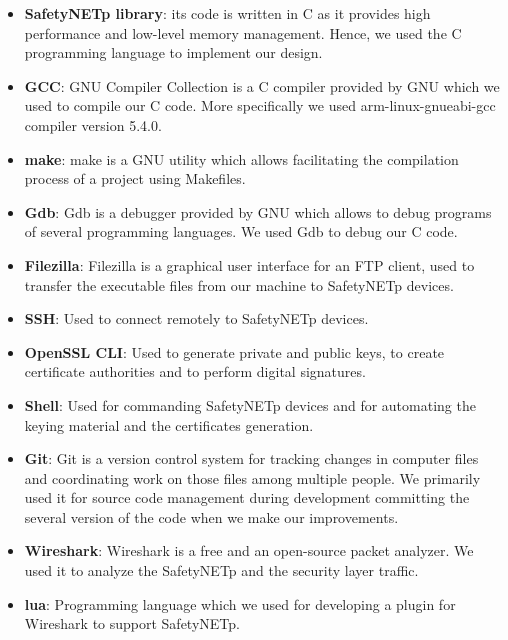 \renewcommand{\labelitemi}{$\bullet$}
\begin{itemize}
\item \textbf{SafetyNETp library}:  its code is written in C as it provides high performance and low-level memory
management. Hence, we used the C programming language to implement our design.

\item \textbf{GCC}: GNU Compiler Collection is a C compiler provided by GNU which we used to compile our C code.
More specifically we used arm-linux-gnueabi-gcc compiler version 5.4.0.

\item \textbf{make}: make is a GNU utility which allows facilitating the compilation process of a project
using Makefiles.

\item \textbf{Gdb}: Gdb is a debugger provided by GNU which allows to debug programs of several programming languages.
We used Gdb to debug our C code.

\item \textbf{Filezilla}: Filezilla is a graphical user interface for an FTP client, used to transfer the executable files
from our machine to SafetyNETp devices.

\item \textbf{SSH}: Used to connect remotely to SafetyNETp devices.

\item \textbf{OpenSSL CLI}: Used to generate private and public keys, to create certificate authorities
and to perform digital signatures.

\item \textbf{Shell}: Used for commanding SafetyNETp devices and for automating the keying material and
the certificates generation.

\item \textbf{Git}: Git is a version control system for tracking changes in computer files and coordinating
work on those files among multiple people. We primarily used it for source code management
during development committing the several version of the code when we make our
improvements.

\item \textbf{Wireshark}: Wireshark is a free and an open-source packet analyzer. We used it to
analyze the SafetyNETp and the security layer traffic.

\item \textbf{lua}: Programming language which we used for developing a plugin for Wireshark to support SafetyNETp.


\end{itemize}
